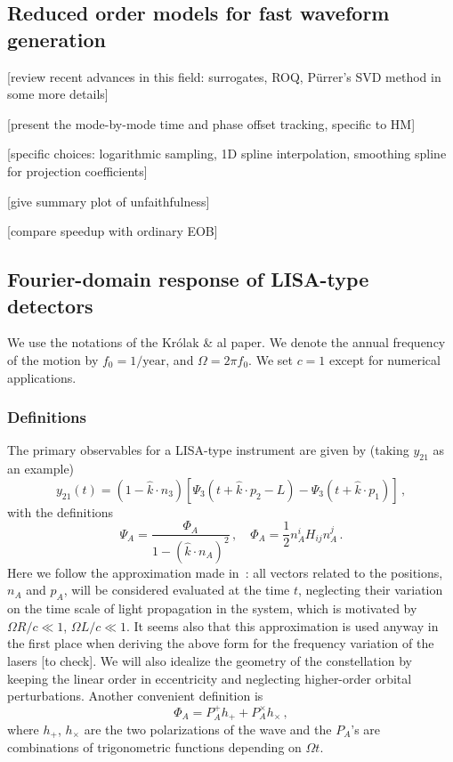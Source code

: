 \documentclass[aps,showpacs,twocolumn,prd,superscriptaddress,nofootinbib]{revtex4}
\newcommand{\be}{\begin{equation}}
\newcommand{\ee}{\end{equation}}
\newcommand{\hatk}{\hat{k}}
\begin{document}

\subsection{Reduced order models for fast waveform generation}
\label{subsec:rom}

[review recent advances in this field: surrogates, ROQ, P\"urrer's SVD method in some more details]

[present the mode-by-mode time and phase offset tracking, specific to HM]

[specific choices: logarithmic sampling, 1D spline interpolation, smoothing spline for projection coefficients]

[give summary plot of unfaithfulness]

[compare speedup with ordinary EOB]


\subsection{Fourier-domain response of LISA-type detectors}
\label{subsec:fdresponse}

We use the notations of the Kr\'olak \& al paper. We denote the annual frequency of the motion by $f_{0}=1/\mathrm{year}$, and $\Omega = 2\pi f_{0}$. We set $c=1$ except for numerical applications.


\subsubsection*{Definitions}

The primary observables for a LISA-type instrument are given by (taking $y_{21}$ as an example)
%
\be
	y_{21}(t) = \left( 1-\hatk \cdot n_{3}\right) \left[ \Psi_{3}(t+\hatk\cdot p_{2} - L) - \Psi_{3}(t+\hatk\cdot p_{1}) \right] \,,
\ee
%
with the definitions
%
\be
	\Psi_{A} = \frac{\Phi_{A}}{1-(\hatk\cdot n_{A})^{2}} \,, \quad \Phi_{A} = \frac{1}{2} n_{A}^{i} H_{ij} n_{A}^{j} \,.
\ee
%
Here we follow the approximation made in~\cite{Krolak+04}: all vectors related to the positions, $n_{A}$ and $p_{A}$, will be considered evaluated at the time $t$, neglecting their variation on the time scale of light propagation in the system, which is motivated by $\Omega R/c \ll 1$, $\Omega L/c\ll 1$. It seems also that this approximation is used anyway in the first place when deriving the above form for the frequency variation of the lasers [to check]. We will also idealize the geometry of the constellation by keeping the linear order in eccentricity and neglecting higher-order orbital perturbations. Another convenient definition is
%
\be
	\Phi_{A} = P_{A}^{+} h_{+} + P_{A}^{\times}h_{\times} \,,
\ee
%
where $h_{+}$, $h_{\times}$ are the two polarizations of the wave and the $P_{A}$'s are combinations of trigonometric functions depending on $\Omega t$. 
\end{document}
